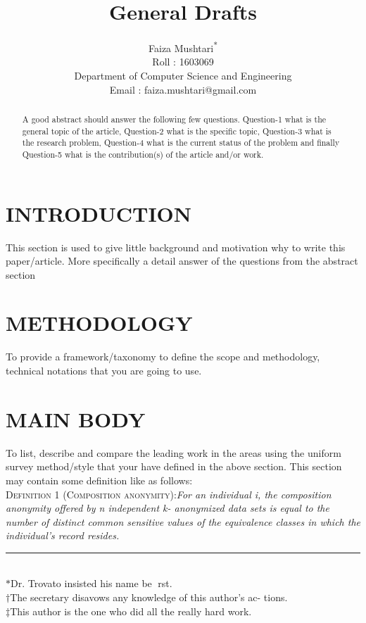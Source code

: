 \documentclass[conference]{sig-alternate}
\begin{document}
\title{General Drafts}

\author{Faiza Mushtari\textsuperscript{*}\\Roll : 1603069\\Department of Computer Science and Engineering\\Email : faiza.mushtari@gmail.com
}


\maketitle


\begin{abstract}
A good abstract should answer the following few
questions. Question-1 what is the general topic of the article,
Question-2 what is the specific topic, Question-3 what is the
research problem, Question-4 what is the current status of the
problem and finally Question-5 what is the contribution(s) of the
article and/or work.
\end{abstract}

\section{INTRODUCTION}
This section is used to give little background and motivation
why to write this paper/article. More specifically a detail
answer of the questions from the abstract section



\section{METHODOLOGY}
To provide a framework/taxonomy to define the scope and
methodology, technical notations that you are going to use.

\section{MAIN BODY}
To list, describe and compare the leading work in the areas
using the uniform survey method/style that your have defined
in the above section. This section may contain some definition
like as follows:\\
\textsc{Definition 1 (Composition anonymity):}\textit{For an individual i,
the composition anonymity offered by n independent k-
anonymized data sets is equal to the number of distinct
common sensitive values of the equivalence classes in which
the individual’s record resides.}\\
\noindent\rule{4cm}{0.4pt}\\
$\ast$Dr. Trovato insisted his name be rst.\\
$\dagger$The secretary disavows any knowledge of this author's ac-
tions.\\
$\ddagger$This author is the one who did all the really hard work.
\end{document}
